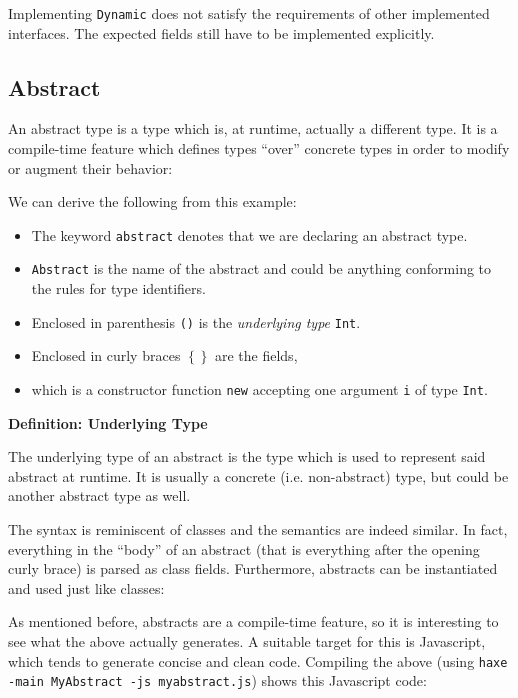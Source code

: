 \documentclass{article}
\newcommand{\target}[1]{#1}
\newcommand{\type}[1]{\texttt{#1}}
\newcommand{\expr}[1]{\texttt{#1}}
\newenvironment{myshaded}
  {\def\FrameCommand{\fboxsep=\topsep\colorbox{bgcolor}}%
  \MakeFramed {\advance\hsize-\width \FrameRestore}}%
 {\endMakeFramed}
\newcommand{\define}[3][Definition]
	{\begin{myshaded}\noindent\textbf{#1: #2}\par\nobreak\noindent\ignorespaces#3\label{def:#2}\end{myshaded}}
\begin{document}

Implementing \type{Dynamic} does not satisfy the requirements of other implemented interfaces. The expected fields still have to be implemented explicitly.





\subsection{Abstract}
\label{Abstract}

An abstract type is a type which is, at runtime, actually a different type. It is a compile-time feature which defines types ``over'' concrete types in order to modify or augment their behavior:


We can derive the following from this example:

\begin{itemize}
	\item The keyword \expr{abstract} denotes that we are declaring an abstract type.
	\item \type{Abstract} is the name of the abstract and could be anything conforming to the rules for type identifiers.
	\item Enclosed in parenthesis \expr{()} is the \emph{underlying type} \type{Int}.
	\item Enclosed in curly braces \expr{$\left\{\right\}$} are the fields,
	\item which is a constructor function \expr{new} accepting one argument \expr{i} of type \type{Int}.
\end{itemize}

\define{Underlying Type}{The underlying type of an abstract is the type which is used to represent said abstract at runtime. It is usually a concrete (i.e. non-abstract) type, but could be another abstract type as well.}

The syntax is reminiscent of classes and the semantics are indeed similar. In fact, everything in the ``body'' of an abstract (that is everything after the opening curly brace) is parsed as class fields. Furthermore, abstracts can be instantiated and used just like classes:


As mentioned before, abstracts are a compile-time feature, so it is interesting to see what the above actually generates. A suitable target for this is \target{Javascript}, which tends to generate concise and clean code. Compiling the above (using \texttt{haxe -main MyAbstract -js myabstract.js}) shows this \target{Javascript} code:
\end{document}
